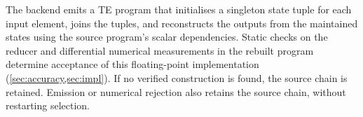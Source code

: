 The backend emits a TE program that initialises a singleton state tuple for each input element, joins the tuples, and reconstructs the outputs from the maintained states using the source program's scalar dependencies.
Static checks on the reducer and differential numerical measurements in the rebuilt program determine acceptance of this floating-point implementation (\cref{sec:accuracy,sec:impl}).
If no verified construction is found, the source chain is retained.
Emission or numerical rejection also retains the source chain, without restarting selection.
